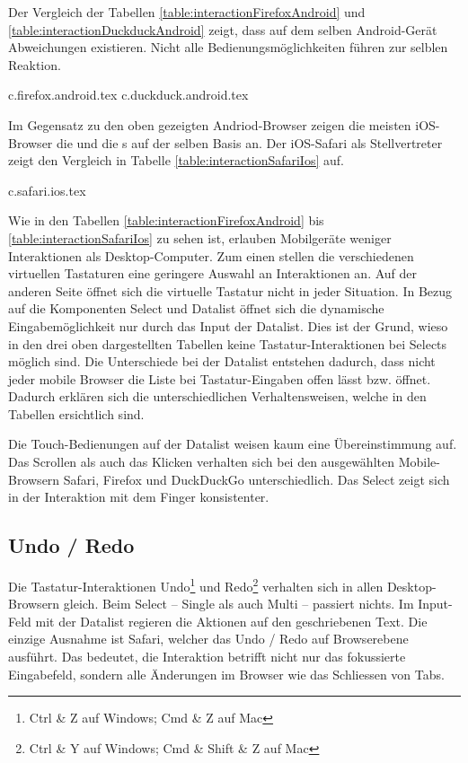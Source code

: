 Der Vergleich der Tabellen \ref{table:interactionFirefoxAndroid} und \ref{table:interactionDuckduckAndroid} zeigt, dass auf dem selben Android-Gerät Abweichungen existieren.
Nicht alle Bedienungsmöglichkeiten führen zur selblen Reaktion.

{c.firefox.android.tex}
{c.duckduck.android.tex}

\clearpage
Im Gegensatz zu den oben gezeigten Andriod-Browser zeigen die meisten iOS-Browser die  und die s auf der selben Basis an.
Der iOS-Safari als Stellvertreter zeigt den Vergleich in Tabelle \ref{table:interactionSafariIos} auf. 

{c.safari.ios.tex}

Wie in den Tabellen \ref{table:interactionFirefoxAndroid} bis \ref{table:interactionSafariIos} zu sehen ist, erlauben Mobilgeräte weniger Interaktionen als Desktop-Computer.
Zum einen stellen die verschiedenen virtuellen Tastaturen eine geringere Auswahl an Interaktionen an.
Auf der anderen Seite öffnet sich die virtuelle Tastatur nicht in jeder Situation. 
In Bezug auf die Komponenten Select und Datalist öffnet sich die dynamische Eingabemöglichkeit nur durch das Input der Datalist.
Dies ist der Grund, wieso in den drei oben dargestellten Tabellen keine Tastatur-Interaktionen bei Selects möglich sind. 
Die Unterschiede bei der Datalist entstehen dadurch, dass nicht jeder mobile Browser die Liste bei Tastatur-Eingaben offen lässt bzw. öffnet.
Dadurch erklären sich die unterschiedlichen Verhaltensweisen, welche in den Tabellen ersichtlich sind.

Die Touch-Bedienungen auf der Datalist weisen kaum eine Übereinstimmung auf. 
Das Scrollen als auch das Klicken verhalten sich bei den ausgewählten Mobile-Browsern Safari, Firefox und DuckDuckGo unterschiedlich.
Das Select zeigt sich in der Interaktion mit dem Finger konsistenter. 


\subsection{Undo / Redo}
\label{sec:undoRedo}

Die Tastatur-Interaktionen Undo\footnote{
    Ctrl \& Z auf Windows; Cmd \& Z auf Mac
} und Redo\footnote{
    Ctrl \& Y auf Windows; Cmd \& Shift \& Z auf Mac
} verhalten sich in allen Desktop-Browsern gleich.
Beim Select – Single als auch Multi – passiert nichts.
Im Input-Feld mit der Datalist regieren die Aktionen auf den geschriebenen Text.
Die einzige Ausnahme ist Safari, welcher das Undo / Redo auf Browserebene ausführt.
Das bedeutet, die Interaktion betrifft nicht nur das fokussierte Eingabefeld, sondern alle Änderungen im Browser wie das Schliessen von Tabs.

